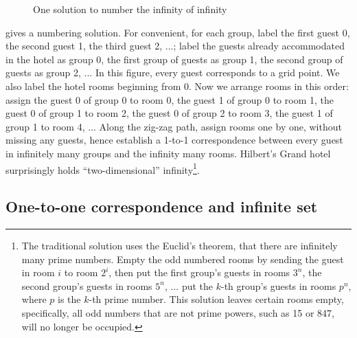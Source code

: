 \documentclass[b5paper]{article}
\begin{document}
\begin{figure}[htbp]
\centering
{}
\caption{One solution to number the infinity of infinity}
\label{fig:NNtoN}
\end{figure}

 gives a numbering solution. For convenient, for each group, label the first guest 0, the second guest 1, the third guest 2, ...; label the guests already accommodated in the hotel as group 0, the first group of guests as group 1, the second group of guests as group 2, ... In this figure, every guest corresponds to a grid point. We also label the hotel rooms beginning from 0. Now we arrange rooms in this order: assign the guest 0 of group 0 to room 0, the guest 1 of group 0 to room 1, the guest 0 of group 1 to room 2, the guest 0 of group 2 to room 3, the guest 1 of group 1 to room 4, ... Along the zig-zag path, assign rooms one by one, without missing any guests, hence establish a 1-to-1 correspondence between every guest in infinitely many groups and the infinity many rooms. Hilbert's Grand hotel surprisingly holds \enquote{two-dimensional} infinity\footnote{The traditional solution uses the Euclid's theorem, that there are infinitely many prime numbers. Empty the odd numbered rooms by sending the guest in room $i$ to room $2^{i}$, then put the first group's guests in rooms $3^{n}$, the second group's guests in rooms $5^{n}$, ... put the $k$-th group's guests in rooms $p^n$, where $p$ is the $k$-th prime number. This solution leaves certain rooms empty, specifically, all odd numbers that are not prime powers, such as 15 or 847, will no longer be occupied.}.

\subsection{One-to-one correspondence and infinite set}
\end{document}
